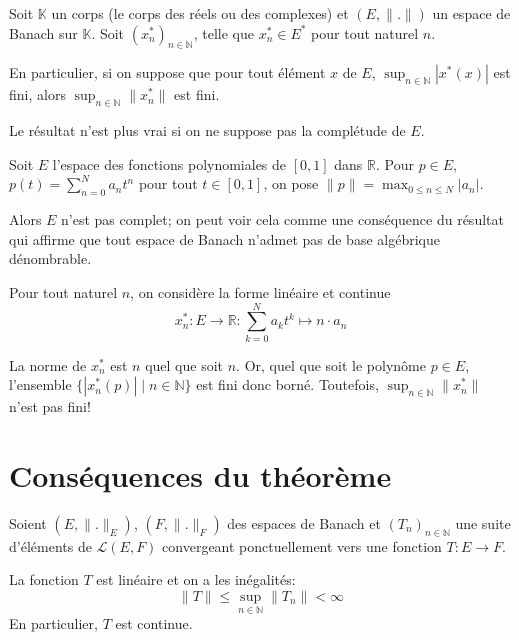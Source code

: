Soit $ \mathbb K$ un corps (le corps des réels ou des complexes)
et $(E, \|.\|)$ un espace de Banach sur $\mathbb K$. Soit
$(x^*_n)_{n\in\mathbb N}$, telle que $x^*_n\in E^*$ pour tout naturel $n$.

En particulier, si on suppose que pour tout élément $x$ de $E$,
$\sup_{n\in\mathbb N}|x^*(x)|$ est fini, alors
$\sup_{n\in\mathbb N}\|x^*_n\|$  est fini.

Le résultat n'est plus vrai si on ne suppose pas la complétude de
$E$.
\begin{ex}
  Soit $E$ l'espace des fonctions polynomiales de $[0, 1]$
  dans $\mathbb R$. Pour $p\in E$, $p(t) =
  \sum_{n=0}^Na_n t^n$ pour tout $t\in [0, 1]$, on pose
  $\|p\| = \max_{0\leq n\leq N}|a_n|$.

  Alors $E$ n'est pas complet; on peut voir cela comme une conséquence
  du résultat qui affirme que tout espace de Banach n'admet pas
  de base algébrique dénombrable.



  Pour tout naturel $n$, on considère la forme linéaire et continue
  $$x^*_n: E\to \mathbb R: \sum_{k=0}^Na_kt^k\mapsto n \cdot a_n$$

  La norme de $x^*_n$ est $n$ quel que soit $n$. Or, quel que
  soit le polynôme $p\in E$, l'ensemble $\{|x^*_n(p)|\mid n\in\mathbb N\}$
  est fini donc borné. Toutefois, $\sup_{n\in\mathbb N} \|x^*_n\|$
  n'est pas fini!
\end{ex}

\section{Conséquences du théorème}

\begin{cor}
  Soient $(E, \|.\|_E)$, $(F, \|.\|_F)$ des espaces de Banach et
  $(T_n)_{n\in\mathbb N}$ une suite d'éléments de $\mathscr{L}(E, F)$
  convergeant ponctuellement vers une fonction $T: E\to F$.

  La fonction $T$ est linéaire et on a les inégalités:
  $$\|T\| \leq \sup_{n\in\mathbb N}\|T_n\| < \infty$$
  En particulier, $T$ est continue.
\end{cor}

